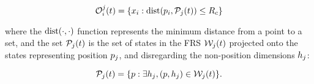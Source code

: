 \begin{equation}
\mathcal{O}_i^j(t) = \{x_i: \text{dist}(p_i, \mathcal{P}_j(t)) \le R_c \}
\end{equation}

\noindent where the $\text{dist}(\cdot, \cdot)$ function represents the minimum distance from a point to a set, and the set $\mathcal{P}_j(t)$ is the set of states in the FRS $\mathcal{W}_j(t)$ projected onto the states representing position $p_j$, and disregarding the non-position dimensions $h_j$:

\begin{equation}
\mathcal{P}_j(t) = \{p: \exists h_j, (p, h_j) \in \mathcal{W}_j(t)\}.
\end{equation}

